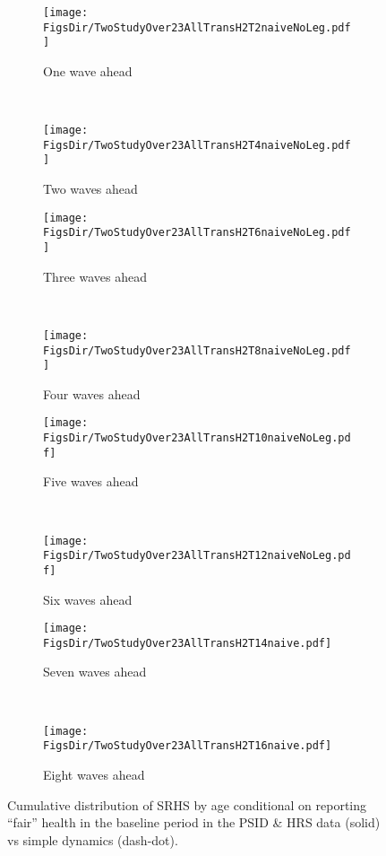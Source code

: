 \documentclass[12pt,pdftex,letterpaper]{article}
\newcommand{\RootDir}{..}
\newcommand{\FigsDir}{\RootDir/Figures}
\begin{document}
\begin{figure}
	\centering
	\begin{subfigure}[b]{0.48\textwidth}
		\texttt{[image: \\FigsDir/TwoStudyOver23AllTransH2T2naiveNoLeg.pdf]}
		\caption{One wave ahead}\label{fig:Naive1AheadFair}
	\end{subfigure}
	~
	\begin{subfigure}[b]{0.48\textwidth}
		\texttt{[image: \\FigsDir/TwoStudyOver23AllTransH2T4naiveNoLeg.pdf]}
		\caption{Two waves ahead}\label{fig:Naive2AheadFair}
	\end{subfigure}
	
	\begin{subfigure}[b]{0.48\textwidth}
		\texttt{[image: \\FigsDir/TwoStudyOver23AllTransH2T6naiveNoLeg.pdf]}
		\caption{Three waves ahead}\label{fig:Naive3AheadFair}
	\end{subfigure}
	~
	\begin{subfigure}[b]{0.48\textwidth}
		\texttt{[image: \\FigsDir/TwoStudyOver23AllTransH2T8naiveNoLeg.pdf]}
		\caption{Four waves ahead}\label{fig:Naive4AheadFair}
	\end{subfigure}
	
	\begin{subfigure}[b]{0.48\textwidth}
		\texttt{[image: \\FigsDir/TwoStudyOver23AllTransH2T10naiveNoLeg.pdf]}
		\caption{Five waves ahead}\label{fig:Naive5AheadFair}
	\end{subfigure}
	~
	\begin{subfigure}[b]{0.48\textwidth}
		\texttt{[image: \\FigsDir/TwoStudyOver23AllTransH2T12naiveNoLeg.pdf]}
		\caption{Six waves ahead}\label{fig:Naive6AheadFair}
	\end{subfigure}
	
	\begin{subfigure}[b]{0.48\textwidth}
		\texttt{[image: \\FigsDir/TwoStudyOver23AllTransH2T14naive.pdf]}
		\caption{Seven waves ahead}\label{fig:Naive7AheadFair}
	\end{subfigure}
	~
	\begin{subfigure}[b]{0.48\textwidth}
		\texttt{[image: \\FigsDir/TwoStudyOver23AllTransH2T16naive.pdf]}
		\caption{Eight waves ahead}\label{fig:Naive8AheadFair}
	\end{subfigure}
	\caption{Cumulative distribution of SRHS by age conditional on reporting ``fair'' health in the baseline period in the PSID \& HRS data (solid) vs simple dynamics (dash-dot).}\label{fig:NaiveTransFR}
\end{figure}
\end{document}

